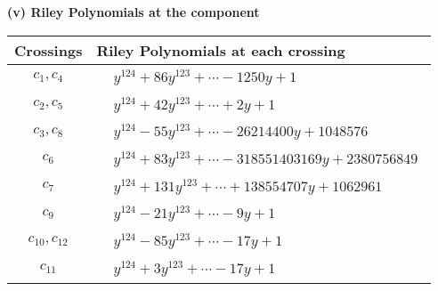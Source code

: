 \documentclass[1p]{elsarticle_modified}
\theoremstyle{definition}
\begin{document}
\newpage\renewcommand{\arraystretch}{1}
\flushleft \textbf{(v) Riley Polynomials at the component}\newline \\
\begin{tabular}{m{50pt}|m{274pt}}
Crossings & \hspace{64pt}Riley Polynomials at each crossing \\
\hline $$\begin{aligned}c_{1},c_{4}\end{aligned}$$&$\begin{aligned}
&y^{124}+86 y^{123}+\cdots-1250 y+1
\end{aligned}$\\
\hline $$\begin{aligned}c_{2},c_{5}\end{aligned}$$&$\begin{aligned}
&y^{124}+42 y^{123}+\cdots+2 y+1
\end{aligned}$\\
\hline $$\begin{aligned}c_{3},c_{8}\end{aligned}$$&$\begin{aligned}
&y^{124}-55 y^{123}+\cdots-26214400 y+1048576
\end{aligned}$\\
\hline $$\begin{aligned}c_{6}\end{aligned}$$&$\begin{aligned}
&y^{124}+83 y^{123}+\cdots-318551403169 y+2380756849
\end{aligned}$\\
\hline $$\begin{aligned}c_{7}\end{aligned}$$&$\begin{aligned}
&y^{124}+131 y^{123}+\cdots+138554707 y+1062961
\end{aligned}$\\
\hline $$\begin{aligned}c_{9}\end{aligned}$$&$\begin{aligned}
&y^{124}-21 y^{123}+\cdots-9 y+1
\end{aligned}$\\
\hline $$\begin{aligned}c_{10},c_{12}\end{aligned}$$&$\begin{aligned}
&y^{124}-85 y^{123}+\cdots-17 y+1
\end{aligned}$\\
\hline $$\begin{aligned}c_{11}\end{aligned}$$&$\begin{aligned}
&y^{124}+3 y^{123}+\cdots-17 y+1
\end{aligned}$\\
\hline
\end{tabular}\\~\\
\end{document}
